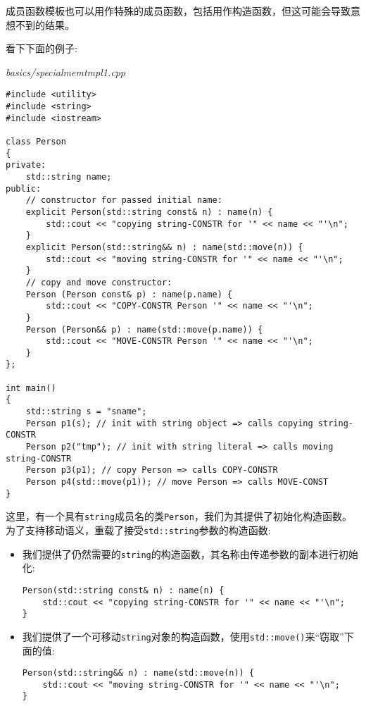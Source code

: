 成员函数模板也可以用作特殊的成员函数，包括用作构造函数，但这可能会导致意想不到的结果。

看下下面的例子:

\noindent
\textit{basics/specialmemtmpl1.cpp}
\begin{lstlisting}[style=styleCXX]
#include <utility>
#include <string>
#include <iostream>

class Person
{
private:
	std::string name;
public:
	// constructor for passed initial name:
	explicit Person(std::string const& n) : name(n) {
		std::cout << "copying string-CONSTR for '" << name << "'\n";
	}
	explicit Person(std::string&& n) : name(std::move(n)) {
		std::cout << "moving string-CONSTR for '" << name << "'\n";
	}
	// copy and move constructor:
	Person (Person const& p) : name(p.name) {
		std::cout << "COPY-CONSTR Person '" << name << "'\n";
	}
	Person (Person&& p) : name(std::move(p.name)) {
		std::cout << "MOVE-CONSTR Person '" << name << "'\n";
	}
};

int main()
{
	std::string s = "sname";
	Person p1(s); // init with string object => calls copying string-CONSTR
	Person p2("tmp"); // init with string literal => calls moving string-CONSTR
	Person p3(p1); // copy Person => calls COPY-CONSTR
	Person p4(std::move(p1)); // move Person => calls MOVE-CONST
}
\end{lstlisting}

这里，有一个具有\texttt{string}成员名的类\texttt{Person}，我们为其提供了初始化构造函数。为了支持移动语义，重载了接受\texttt{std::string}参数的构造函数:

\begin{itemize}
\item 
我们提供了仍然需要的\texttt{string}的构造函数，其名称由传递参数的副本进行初始化:

\begin{lstlisting}[style=styleCXX]
Person(std::string const& n) : name(n) {
	std::cout << "copying string-CONSTR for '" << name << "'\n";
}
\end{lstlisting}

\item 
我们提供了一个可移动\texttt{string}对象的构造函数，使用\texttt{std::move()}来“窃取”下面的值:

\begin{lstlisting}[style=styleCXX]
Person(std::string&& n) : name(std::move(n)) {
	std::cout << "moving string-CONSTR for '" << name << "'\n";
}
\end{lstlisting}
\end{itemize}

